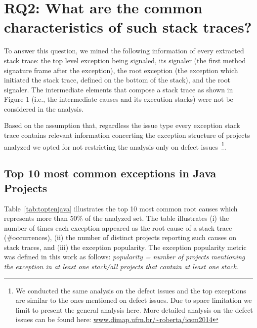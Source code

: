 \documentclass[conference]{IEEEtran}
\begin{document}


\section{RQ2: What are the common characteristics of such stack traces?}

To answer this question, we mined the following information of every extracted stack trace: the top level exception being signaled, its signaler (the first method signature frame after the exception), the root exception (the exception which initiated the stack trace, defined on the bottom of the stack), and the root signaler. The intermediate elements that compose a stack trace as shown in Figure 1 (i.e., the intermediate causes and its execution stacks) were not be considered in the analysis.

Based on the assumption that, regardless the issue type every exception stack trace contains relevant information concerting the exception structure of projects analyzed we opted for not restricting the analysis only on defect issues~\footnote{We conducted the same analysis on the defect issues and the top exceptions are similar to the ones mentioned on defect issues. Due to space limitation we limit to present the general analysis here. More detailed analysis on the defect issues can be found here: \url{www.dimap.ufrn.br/~roberta/icsm2014}}. 

\subsection{Top 10 most common exceptions in Java Projects}

Table~\ref{tab:toptenjava} illustrates the top 10 most common root causes which represents more than 50\% of the analyzed set. The table illustrates  (i) the number of times each exception appeared as the root cause of a stack trace (\#occurrences), (ii) the number of distinct projects reporting such causes on stack traces, and (iii) the exception popularity. The exception popularity metric was defined in this work as follows: \emph{popularity = number of projects mentioning the exception in at least one stack/all projects that contain at least one stack}.
\end{document}
